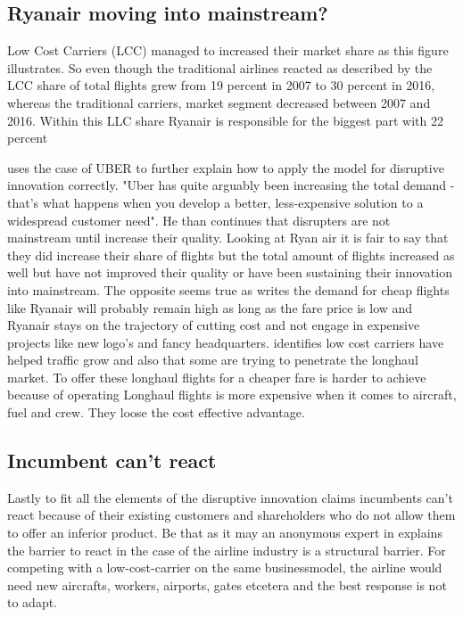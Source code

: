 \documentclass[a4paper, 11pt]{article}
\begin{document}
\subsection{Ryanair moving into mainstream?}
\label{limits}


Low Cost Carriers (LCC) managed to increased their market share as this figure illustrates. So even though the traditional airlines reacted as described by \citep{Dennis} the LCC share of total flights grew from 19 percent in 2007 to 30 percent in 2016, whereas the traditional carriers, market segment decreased between 2007 and 2016. Within this LLC share Ryanair is responsible for the biggest part with 22 percent \citep{Eurocontrol2017}

\citep{Christensen2015} uses the case of UBER to further explain how to apply the model for disruptive innovation correctly. "Uber has quite arguably been increasing the total demand - that's what happens when you develop a better, less-expensive solution to a widespread customer need"\citep[p. 4]{Christensen2015}. He than continues that disrupters are not mainstream until increase their quality. Looking at Ryan air it is fair to say that they did increase their share of flights but the total amount of flights increased as well \citep{Eurocontrol2018} but have not improved their quality or have been sustaining their innovation into mainstream. The opposite seems true as \citep{barrett} writes the demand for cheap flights like Ryanair will probably remain high as long as the fare price is low and Ryanair stays on the trajectory of cutting cost and not engage in expensive projects like new logo's and fancy headquarters. \cite{Eurocontrol2018} identifies low cost carriers have helped traffic grow and also that some are trying to penetrate the longhaul market. To offer these longhaul flights for a cheaper fare is harder to achieve because of operating Longhaul flights is more expensive when it comes to aircraft, fuel and crew. They loose the cost effective advantage.


\subsection{Incumbent can't react}
\label{What did they do}

Lastly to fit all the elements of the disruptive innovation \cite{Christensen97} claims incumbents can't react because of their existing customers and shareholders who do not allow them to offer an inferior product.
Be that as it may an anonymous expert in \cite{king} explains the barrier to react in the case of the airline industry is a structural barrier. For competing with a low-cost-carrier on the same businessmodel, the airline would need new aircrafts, workers, airports, gates etcetera and the best response is not to adapt.
\end{document}
